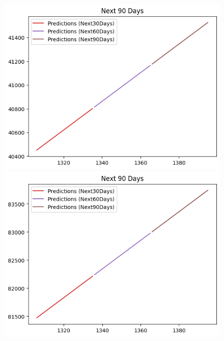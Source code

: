 \begin{figure}[H]
\begin{minipage}{0.15\textwidth}
    \end{minipage}
    \hfill
        \begin{minipage}{0.15\textwidth}
    \centering
    \includegraphics[width=1\textwidth]{resources/chapter-5/newdata1/predicted/BIDV_LinearRegression_9-1_90Days.png}
    \end{minipage}
    \hfill
    \begin{minipage}{0.15\textwidth}
    \centering
    \includegraphics[width=1\textwidth]{resources/chapter-5/newdata1/predicted/VCB_LinearRegression_7-3_90Days.png}
    \end{minipage}
    \hfill
    \begin{minipage}{0.15\textwidth}

\end{minipage}
\end{figure}
